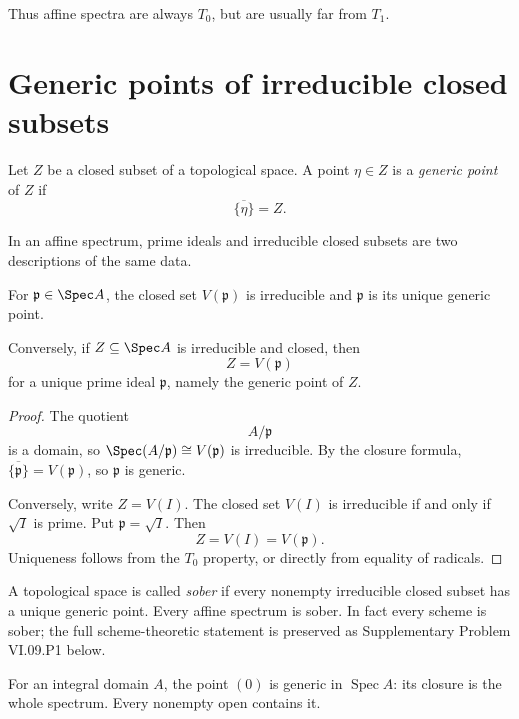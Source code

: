 Thus affine spectra are always $T_0$, but are usually far from $T_1$.

\section{Generic points of irreducible closed subsets}

\begin{definition}
Let $Z$ be a closed subset of a topological space.  A point $\eta\in Z$ is a
\emph{generic point} of $Z$ if
\[
\overline{\{\eta\}}=Z.
\]
\end{definition}

In an affine spectrum, prime ideals and irreducible closed subsets are two descriptions of
the same data.

\begin{theorem}
For $\mathfrak p\in\Spec A$, the closed set $V(\mathfrak p)$ is irreducible and
$\mathfrak p$ is its unique generic point.

Conversely, if $Z\subseteq\Spec A$ is irreducible and closed, then
\[
Z=V(\mathfrak p)
\]
for a unique prime ideal $\mathfrak p$, namely the generic point of $Z$.
\end{theorem}

\begin{proof}
The quotient
\[
A/\mathfrak p
\]
is a domain, so $\Spec(A/\mathfrak p)\cong V(\mathfrak p)$ is irreducible.  By the closure
formula, $\overline{\{\mathfrak p\}}=V(\mathfrak p)$, so $\mathfrak p$ is generic.

Conversely, write $Z=V(I)$.  The closed set $V(I)$ is irreducible if and only if
$\sqrt I$ is prime.  Put $\mathfrak p=\sqrt I$.  Then
\[
Z=V(I)=V(\mathfrak p).
\]
Uniqueness follows from the $T_0$ property, or directly from equality of radicals.
\end{proof}



\begin{remark}[Sobriety]
A topological space is called \emph{sober} if every nonempty irreducible closed subset has
a unique generic point.  Every affine spectrum is sober.  In fact every scheme is sober;
the full scheme-theoretic statement is preserved as Supplementary Problem VI.09.P1 below.
\end{remark}

\begin{example}\label{ex:vi09-expand-01}
For an integral domain $A$, the point $(0)$ is generic in $\operatorname{Spec}A$: its closure is the whole spectrum.  Every nonempty open contains it.
\end{example}
